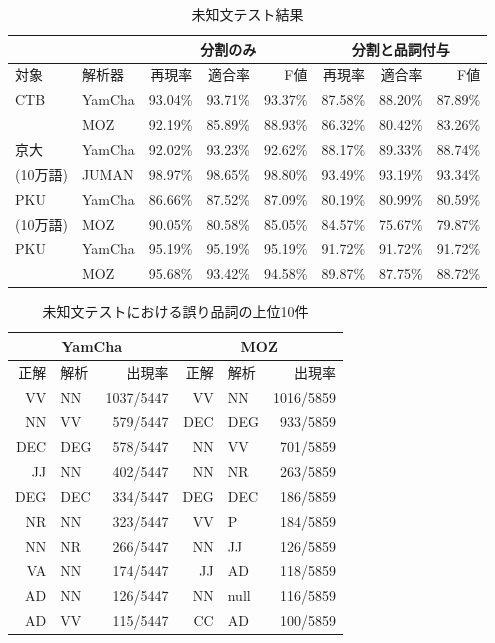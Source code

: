 \begin{table}[htb]
 \begin{center}
  \caption{未知文テスト結果}\label{MOR_Opentest}
\begin{tabular}{ll|rrr|rrr} 
\hline
& &\multicolumn{3}{c}{分割のみ} & \multicolumn{3}{|c}{分割と品詞付与}\\
\hline
対象 &解析器       & 再現率 & 適合率 & F値 & 再現率 & 適合率    &F値\\ 
\hline
CTB      &YamCha & 93.04\%& 93.71\%&93.37\%& 87.58\% & 88.20\%&87.89\%\\ 
         &MOZ    & 92.19\%& 85.89\%&88.93\%& 86.32\% & 80.42\%&83.26\%\\ 
\hline
京大     &YamCha & 92.02\%& 93.23\%&92.62\%& 88.17\%& 89.33\%&88.74\%\\
(10万語) &JUMAN  & 98.97\%& 98.65\%&98.80\%& 93.49\%& 93.19\%&93.34\%\\
\hline
PKU&YamCha & 86.66\%& 87.52\%&87.09\%& 80.19\%& 80.99\%&80.59\%\\
(10万語)    &MOZ    & 90.05\%& 80.58\%&85.05\%& 84.57\%& 75.67\%&79.87\%\\
\hline
PKU      &YamCha & 95.19\%& 95.19\%&95.19\%& 91.72\%& 91.72\%&91.72\%\\
         &MOZ    & 95.68\%& 93.42\%&94.58\%& 89.87\%& 87.75\%&88.72\%\\ \hline
  \end{tabular}
 \end{center}
\end{table}
\begin{table}[htb]
  \begin{center}
   \caption{未知文テストにおける誤り品詞の上位10件}
   \label{MoropenResult2}
   \begin{tabular}{r@{ - }l|r|r@{ - }l|r}  \hline
\multicolumn{3}{c|}{YamCha}    & \multicolumn{3}{c}{MOZ} \\ 
\hline
    正解 & 解析 & 出現率     & 正解 & 解析& 出現率\\ 
\hline
     VV  &  NN  &  1037/5447 &  VV  & NN  &1016/5859 \\
     NN  &  VV  &  579/5447  &  DEC & DEG &933/5859 \\
     DEC &  DEG &  578/5447  &  NN  & VV  &701/5859 \\  
     JJ  &  NN  &  402/5447  &  NN  & NR  &263/5859 \\ 
     DEG &  DEC &  334/5447  &  DEG & DEC &186/5859 \\ 
     NR &   NN  & 323/5447   &  VV  & P   &184/5859 \\ 
     NN  &  NR  & 266/5447   &  NN  & JJ  & 126/5859 \\ 
     VA  &  NN  & 174/5447   &  JJ  & AD  &118/5859 \\ 
     AD  &  NN  & 126/5447   &  NN  & null&116/5859 \\ 
     AD  &  VV  & 115/5447   &  CC  & AD  &100/5859 \\ 
\hline
   \end{tabular}
  \end{center}
\end{table}


